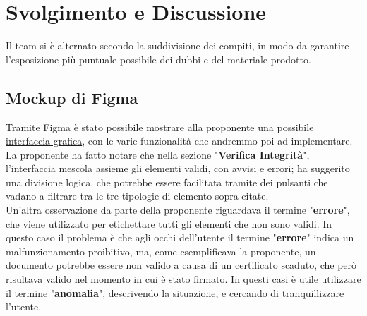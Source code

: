 \documentclass[a4paper,12pt]{article}
\begin{document}
\vspace{0.5cm}

\section{Svolgimento e Discussione}
Il team si è alternato secondo la suddivisione dei compiti, in modo da garantire l'esposizione più puntuale possibile dei dubbi e del materiale prodotto.

\subsection{Mockup di Figma}
Tramite Figma è stato possibile mostrare alla proponente una possibile \href{https://www.figma.com/make/uPoL8sccrgQx38UNpq8X6B/DIP-Reader-UI-Design--Copy-?node-id=0-1&p=f&fullscreen=1}{interfaccia grafica}, con le varie funzionalità che andremmo poi ad implementare. La proponente ha fatto notare che nella sezione "\textbf{Verifica Integrità}", l'interfaccia mescola assieme gli elementi validi, con avvisi e errori; ha suggerito una divisione logica, che potrebbe essere facilitata tramite dei pulsanti che vadano a filtrare tra le tre tipologie di elemento sopra citate. 
\\ Un'altra osservazione da parte della proponente riguardava il termine "\textbf{errore}", che viene utilizzato per etichettare tutti gli elementi che non sono validi. In questo caso il problema è che agli occhi dell'utente il termine "\textbf{errore}" indica un malfunzionamento proibitivo, ma, come esemplificava la proponente, un documento potrebbe essere non valido a causa di un certificato scaduto, che però risultava valido nel momento in cui è stato firmato. In  questi casi è utile utilizzare il termine "\textbf{anomalia}", descrivendo la situazione, e cercando di tranquillizzare l'utente.
\end{document}
